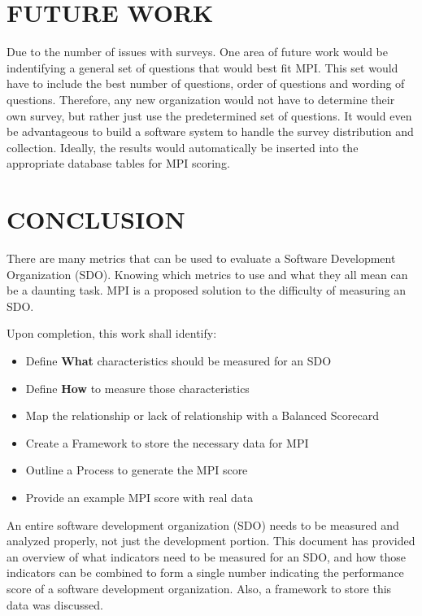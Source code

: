 \documentclass[SDSUThesis.tex]{subfiles}
\begin{document}
\section{FUTURE WORK}

Due to the number of issues with surveys.  One area of future work would be indentifying
a general set of questions that would best fit MPI.  This set would have to include
the best number of questions, order of questions and wording of questions.  Therefore,
any new organization would not have to determine their own survey, but rather just use the
predetermined set of questions.  It would even be advantageous to build a software system to
handle the survey distribution and collection.  Ideally, the results would automatically be
inserted into the appropriate database tables for MPI scoring. 

\section{CONCLUSION}

There are many metrics that can be used to evaluate a Software Development Organization (SDO). 
Knowing which metrics to use and what they all mean can be a daunting task.  MPI is a
proposed solution to the difficulty of measuring an SDO.

Upon completion, this work shall identify:
\begin{itemize}
    \item Define \textbf{What} characteristics should be measured for an SDO
    \item Define \textbf{How} to measure those characteristics
    \item Map the relationship or lack of relationship with a Balanced Scorecard
    \item Create a Framework to store the necessary data for MPI
    \item Outline a Process to generate the MPI score
    \item Provide an example MPI score with real data
\end{itemize}

An entire software development organization (SDO) needs to be measured and analyzed properly, not just the development portion. This document has provided an overview of what indicators need to be measured for an SDO, and how those indicators can be combined to form a single number indicating the performance score of a software development organization.  Also, a framework to store this data was discussed.
\end{document}
